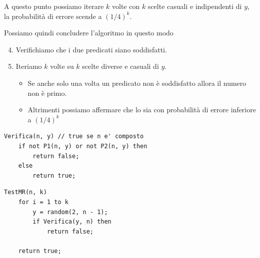 A questo punto possiamo iterare $k$ volte con $k$ scelte casuali e indipendenti di $y$, la probabilit\`a di errore scende
a $(1/4)^k$.

Possiamo quindi concludere l'algoritmo in questo modo
\begin{enumerate}
	\setcounter{enumi}{3}
	\item Verifichiamo che i due predicati siano soddisfatti.
	\item Iteriamo $k$ volte su $k$ scelte diverse e casuali di $y$.
	      \begin{itemize}
		      \item Se anche solo una volta un predicato non \`e soddisfatto allora il numero non \`e primo.
		      \item Altrimenti possiamo affermare che lo sia con probabilit\`a di errore inferiore a $(1/4)^k$
	      \end{itemize}
\end{enumerate}

\begin{lstlisting}
Verifica(n, y) // true se n e' composto
	if not P1(n, y) or not P2(n, y) then
		return false;
	else
		return true;
\end{lstlisting}

\begin{lstlisting}
TestMR(n, k)
	for i = 1 to k
		y = random(2, n - 1);
		if Verifica(y, n) then 
			return false;

	return true;
\end{lstlisting}

